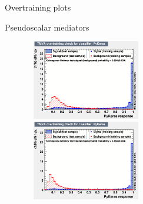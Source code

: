 \documentclass[8pt]{beamer}
\begin{document}
\begin{frame}{Overtraining plots}
\vspace{-5pt}
\begin{block}{\centering Pseudoscalar mediators}\end{block} \vspace{-10pt}
\begin{figure}[htbp]
\centering
\begin{minipage}[b]{.49\textwidth}
\begin{center}
\includegraphics[width=5.2cm, height=3.5cm]{figs/overtraining_pseudo100.png}
\end{center}
\end{minipage}\hfill
\begin{minipage}[b]{.49\textwidth}
\begin{center}
\includegraphics[width=5.2cm, height=3.5cm]{figs/overtraining_pseudo500.png}
\end{center}
\end{minipage} \hfill
\end{figure} \vfill
\end{frame}
\end{document}

